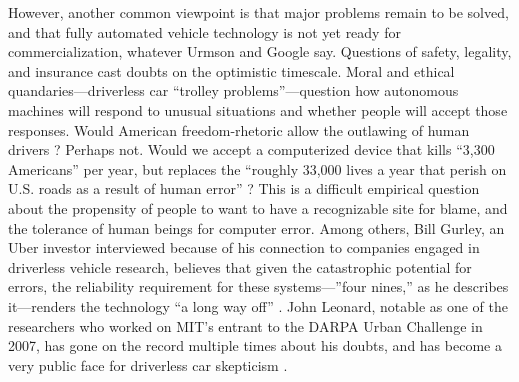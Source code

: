 
However, another common viewpoint is that major problems remain to be
solved, and that fully automated vehicle technology is not yet ready for
commercialization, whatever Urmson and Google 
say. Questions of safety, legality, and insurance cast doubts on the
optimistic timescale. Moral and ethical
quandaries---driverless car ``trolley problems''---question how
autonomous machines will respond to unusual situations and whether
people will accept those responses. Would American freedom-rhetoric
allow the outlawing of human drivers \cite{badgerElon}? 
Perhaps not. Would we accept a computerized device that kills ``3,300
Americans'' per year, but replaces the ``roughly 33,000 lives a year
that perish on U.S. roads as a result of human
error'' \cite{mcfarlandDriverless}?
This is a difficult empirical question about the propensity of people
to want to have a recognizable site for blame, and the tolerance of
human beings for computer error. Among others, Bill Gurley, an Uber
investor interviewed because of his connection to companies engaged in
driverless vehicle research, believes that given the
catastrophic potential for errors, the reliability requirement
for these systems---''four nines,'' as he describes it---renders the
technology ``a long way 
off'' \cite{shontellTop}. John Leonard, notable as one of the researchers who
worked on MIT's entrant to the DARPA Urban Challenge in 2007, has gone
on the record multiple times about his doubts, and has become a very
public face for driverless car skepticism \cite{ramseyWhen} \cite{gomesCircles}.




